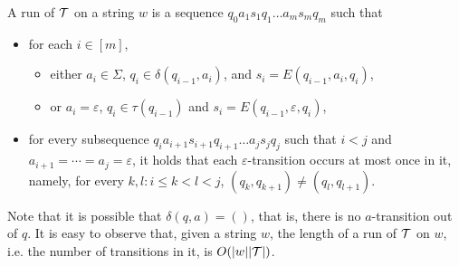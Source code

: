 A run of $\mathcal{T}$ on a string $w$ is a sequence $q_0 a_1 s_1 q_1 \ldots a_m s_m q_m$ such that
\begin{itemize}
%
\item for each $i \in [m]$, 
\begin{itemize}
\item either $a_i \in \Sigma$, $q_i \in \delta (q_{i-1}, a_i)$, and $s_i = E (q_{i - 1}, a_i, q_i)$, 
\item or $a_i = \varepsilon$, $q_i \in \tau(q_{i-1})$ and $s_i = E (q_{i - 1}, \varepsilon, q_i)$,
\end{itemize}

\item for every subsequence $q_i a_{i+1} s_{i+1} q_{i+1} \ldots a_{j} s_j q_j$ such that  $i < j$ and $a_{i+1} = \cdots = a_j = \varepsilon$,  it holds that each $\varepsilon$-transition occurs at most once in it, namely, for every $k, l: i \le k < l < j$, $(q_k, q_{k+1}) \neq (q_l, q_{l+1})$.
\end{itemize}
Note that it is possible that $\delta(q, a) = ()$, that is, there is no $a$-transition out of $q$. 
It is easy to observe that, given a string $w$, the length of a run of $\mathcal{T}$ on $w$, i.e. the number of transitions in it, is $O(|w||\mathcal{T}|)$. 

